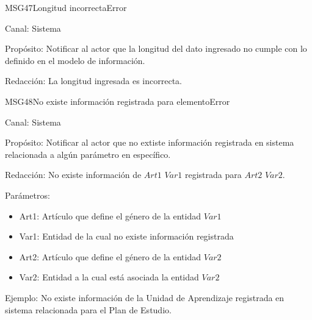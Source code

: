 \begin{mensaje}{MSG47}{Longitud incorrecta}{Error}
	\item[Canal:] Sistema
	\item[Propósito:] Notificar al actor que la longitud del dato ingresado no cumple con lo definido en el modelo de información. 
	\item[Redacción:] La longitud ingresada es incorrecta.
	
\end{mensaje}


\begin{mensaje}{MSG48}{No existe información registrada para elemento}{Error}
	\item[Canal:] Sistema
	\item[Propósito:] Notificar al actor que no extiste información registrada en sistema relacionada a algún parámetro en específico.
	\item[Redacción:] No existe información de $Art1$ $Var1$ registrada para $Art2$ $Var2$.
	\item[Parámetros:] 
	\begin{itemize}
		\item Art1: Artículo que define el género de la entidad $Var1$
		\item Var1: Entidad de la cual no existe información registrada
		\item Art2: Artículo que define el género de la entidad $Var2$
		\item Var2: Entidad a la cual está asociada la entidad $Var2$
	\end{itemize}
	\item[Ejemplo:] No existe información de la Unidad de Aprendizaje registrada en sistema relacionada para el Plan de Estudio.
	
\end{mensaje}

